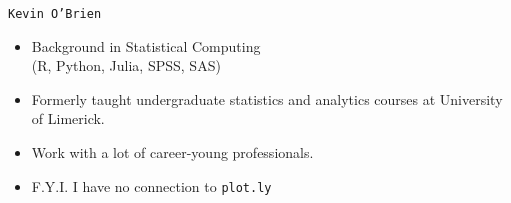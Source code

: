 \documentclass{beamer}
\begin{document}
\begin{frame}
	\Large
	\texttt{Kevin O'Brien}
	\medskip
	\begin{itemize}
		\item Background in Statistical Computing \\
		{\large (R, Python, Julia, SPSS, SAS)}
		\medskip
		\item Formerly taught undergraduate statistics and analytics courses at University of Limerick.
		\medskip
		\item Work with a lot of career-young professionals.
		\medskip
		\item F.Y.I. I have no connection to \texttt{plot.ly}
	\end{itemize}
\end{frame}
\end{document}
